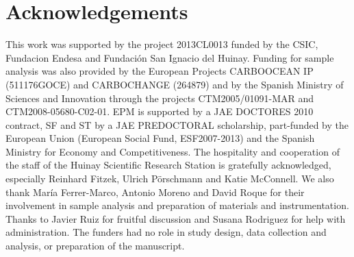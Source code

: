 \section{Acknowledgements}\label{acknowledgements}


This work was supported by the project 2013CL0013 funded by the CSIC,
Fundacion Endesa and Fundación San Ignacio del Huinay. Funding for
sample analysis was also provided by the European Projects CARBOOCEAN IP
(511176GOCE) and CARBOCHANGE (264879) and by the Spanish Ministry of
Sciences and Innovation through the projects CTM2005/01091-MAR and
CTM2008-05680-C02-01. EPM is supported by a JAE DOCTORES 2010 contract,
SF and ST by a JAE PREDOCTORAL scholarship, part-funded by the European
Union (European Social Fund, ESF2007-2013) and the Spanish Ministry for
Economy and Competitiveness. The hospitality and cooperation of the
staff of the Huinay Scientific Research Station is gratefully
acknowledged, especially Reinhard Fitzek, Ulrich Pörschmann and Katie
McConnell. We also thank María Ferrer-Marco, Antonio Moreno and David
Roque for their involvement in sample analysis and preparation of
materials and instrumentation. Thanks to Javier Ruiz for fruitful
discussion and Susana Rodriguez for help with administration. The
funders had no role in study design, data collection and analysis, or
preparation of the manuscript.
